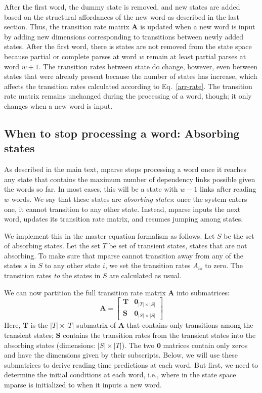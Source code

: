 \documentclass[a4paper, 12pt]{article}
\begin{document}
After the first word, the dummy state is removed, and new states are added
based on the structural affordances of the new word as described in the last
section. Thus, the transition rate matrix $\mathbf{A}$ is updated when a new
word is input by adding new dimensions corresponding to transitions between
newly added states. After the first word, there is states are not removed from
the state space because partial or complete parses at word $w$ remain at least
partial parses at word $w+1$. The transition rates between state do change,
however, even between states that were already present because the number of
states has increase, which affects the transition rates calculated according to
Eq.~\ref{arr-rate}. The transition rate matrix remains unchanged during the
processing of a word, though; it only changes when a new word is input.

\subsection{When to stop processing a word: Absorbing states}
As described in the main text, mparse stops processing a word once it reaches
any state that contains the maximum number of dependency links possible given
the words so far. In most cases, this will be a state with $w - 1$ links after
reading $w$ words. We say that these states are \emph{absorbing states}: once
the system enters one, it cannot transition to any other state. Instead, mparse
inputs the next word, updates its transition rate matrix, and resumes jumping
among states.

We implement this in the master equation formalism as follows. Let $S$ be the
set of absorbing states. Let the set $T$ be set of transient states, states
that are not absorbing. To make sure that mparse cannot transition away from
any of the states $s$ in $S$ to any other state $i$, we set the transition rates
$A_{is}$ to zero. The transition rates \emph{to} the states in $S$ are
calculated as usual.

We can now partition the full transition rate matrix $\mathbf{A}$ into
submatrices:
\begin{equation}\label{eq:submatrices}
    \mathbf{A} = \begin{bmatrix} \mathbf{T} & \mathbf{0}_{|T|\times |S|} \\
                                 \mathbf{S} & \mathbf{0}_{|S|\times |S|}
                 \end{bmatrix}
\end{equation}
Here, $\mathbf{T}$ is the $|T|\times |T|$ submatrix of $\mathbf{A}$ that contains only
transitions among the transient states; $\mathbf{S}$ contains the transition
rates from the transient states into the absorbing states (dimensions:
$|S|\times |T|$). The two $\mathbf{0}$
matrices contain only zeros and have the dimensions given by their subscripts.
Below, we will use these submatrices to derive reading time predictions at each
word. But first, we need to determine the initial conditions at each word,
i.e., where in the state space mparse is initialized to when it inputs a new
word.
\end{document}
